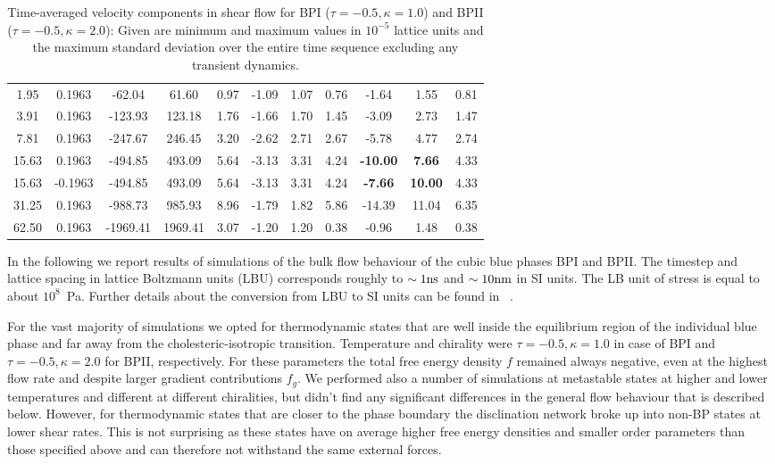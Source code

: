 \documentclass[aps,pre,reprint,superscriptaddress, twocolumn]{revtex4}
\begin{document}
\begin{table}[htpb]
\begin{tabular}{|c|| c || c |c |c||c| c| c||c| c| c|}
1.95 & 0.1963 &-62.04  &61.60 & 0.97 & -1.09 &1.07 & 0.76 & -1.64 & 1.55 & 0.81\\
3.91 & 0.1963 &-123.93 &123.18 & 1.76 &-1.66 &1.70 & 1.45 &-3.09& 2.73 &1.47\\
7.81 &0.1963  &-247.67 &246.45 & 3.20 &-2.62 &2.71 & 2.67 &-5.78 & 4.77 &2.74\\
15.63 &0.1963 &-494.85 &493.09 & 5.64 &-3.13 &3.31 &4.24 &\bf{-10.00} & \bf{7.66} &4.33\\
15.63 &-0.1963&-494.85 &493.09 & 5.64 & -3.13 &3.31 &4.24 &\bf{-7.66} & \bf{10.00} &4.33\\
31.25 &0.1963 &-988.73 &985.93 &8.96  &-1.79 &1.82 &5.86 &-14.39 & 11.04 &6.35\\
62.50 &0.1963 & -1969.41  & 1969.41 & 3.07 & -1.20 & 1.20 & 0.38 &-0.96 & 1.48 &0.38 \\
\hline
\end{tabular}
\caption{Time-averaged velocity components in shear flow for BPI ($\tau=-0.5, \kappa=1.0$) and BPII ($\tau=-0.5, \kappa=2.0$): Given are minimum and maximum values in $10^{-5}$ lattice units and the maximum standard deviation over the entire time sequence excluding any transient dynamics.}
\label{tab1}
\end{table}

In the following we report results of simulations of the bulk flow behaviour of the cubic blue 
phases BPI and BPII. 
The timestep and lattice spacing in lattice Boltzmann units (LBU) corresponds roughly to
$\sim 1 {\rm ns}$ and $\sim 10{\rm nm}$ in SI units. The LB unit of stress
is equal to about $10^8$~Pa. Further details about the conversion 
from LBU to SI units can be found in ~\cite{Henrich:2011a,Henrich:2010b}.

For the vast majority of simulations we opted for thermodynamic states that are 
well inside the equilibrium region of the individual blue phase and far away 
from the cholesteric-isotropic transition. Temperature and chirality were 
$\tau=-0.5, \kappa=1.0$ in case of BPI and $\tau=-0.5, \kappa=2.0$ for BPII, respectively.
For these parameters the total free energy density $f$ remained always negative, 
even at the highest flow rate and despite larger gradient contributions $f_g$.
We performed also a number of simulations at metastable states at higher and lower temperatures 
and different at different chiralities, but didn't find any significant differences in the 
general flow behaviour that is described below.
However, for thermodynamic states that are closer to the phase boundary the disclination 
network broke up into non-BP states at lower shear rates. This is not surprising as
these states have on average higher free energy densities and smaller order parameters
than those specified above and can therefore not withstand the same external forces.
\end{document}
